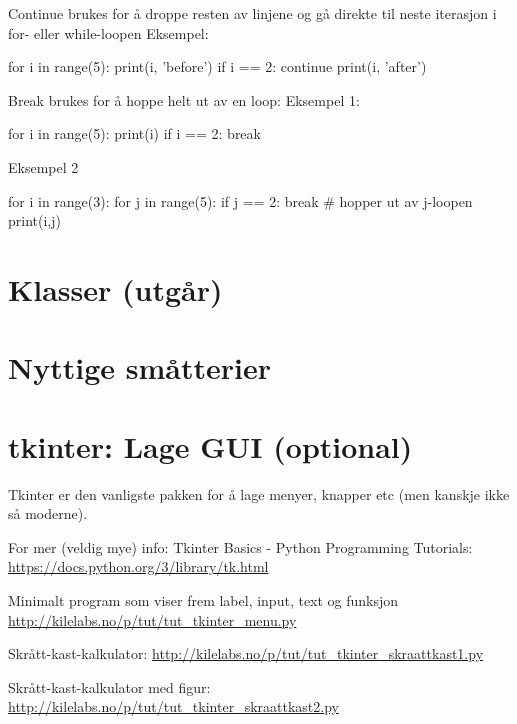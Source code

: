 Continue brukes for å droppe resten av linjene og gå direkte til neste iterasjon i for- eller while-loopen
Eksempel:
\begin{usncodebox}
for i in range(5): 
    print(i, 'before')
    if i == 2: continue
    print(i, 'after')
\end{usncodebox}

Break brukes for å hoppe helt ut av en loop: 
Eksempel 1: 
\begin{usncodebox}
for i in range(5): 
    print(i)
    if i == 2: break
\end{usncodebox}

Eksempel 2
\begin{usncodebox}
for i in range(3): 
    for j in range(5): 
         if j == 2: break  # hopper ut av j-loopen
         print(i,j)
\end{usncodebox}

\section{Klasser (utgår)}

\section{Nyttige småtterier}

\section{tkinter: Lage GUI (optional)}

Tkinter er den vanligste pakken for å lage menyer, knapper etc (men kanskje ikke så moderne). 

For mer (veldig mye) info: 
Tkinter Basics - Python Programming Tutorials:
\url{https://docs.python.org/3/library/tk.html}

Minimalt program som viser frem label, input, text og funksjon
\url{http://kilelabs.no/p/tut/tut_tkinter_menu.py}

Skrått-kast-kalkulator: 
\url{http://kilelabs.no/p/tut/tut_tkinter_skraattkast1.py}

Skrått-kast-kalkulator med figur: 
\url{http://kilelabs.no/p/tut/tut_tkinter_skraattkast2.py}
